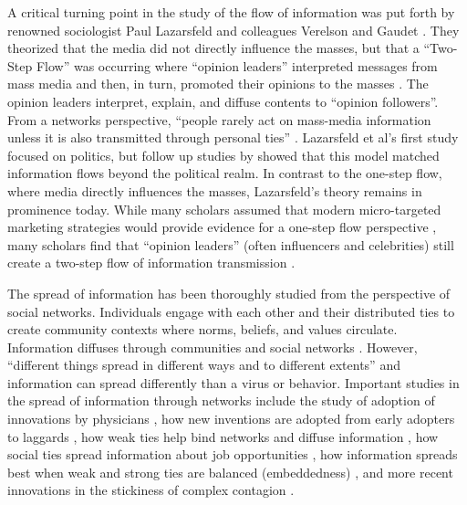 A critical turning point in the study of the flow of information was put forth
by renowned sociologist Paul Lazarsfeld and colleagues Verelson and Gaudet
\citeyearpar{lazarsfeldPeopleChoice1944}. They theorized that the media did not
directly influence the masses, but that a ``Two-Step Flow'' was occurring where
``opinion leaders'' interpreted messages from mass media and then, in turn,
promoted their opinions to the masses \citep{katzPersonalInfluencePart1955}. The
opinion leaders interpret, explain, and diffuse contents to ``opinion followers''.
From a networks perspective, ``people rarely act on mass-media information unless
it is also transmitted through personal ties'' \citep[p.
1374]{granovetterStrengthWeakTies1973}. Lazarsfeld et al's
\citeyearpar{lazarsfeldPeopleChoice1944} first study focused on politics, but
follow up studies by \citet{katzPersonalInfluencePart1955} showed that this
model matched information flows beyond the political realm. In contrast to the
one-step flow, where media directly influences the masses, Lazarsfeld's theory
remains in prominence today. While many scholars assumed that modern
micro-targeted marketing strategies would provide evidence for a one-step flow
perspective \citep{bennettOneStepFlowCommunication2006}, many scholars find that
``opinion leaders'' (often influencers and celebrities) still create a two-step
flow of information transmission \citep{choi15, hilbertOneStepTwo2017}.

The spread of information has been thoroughly studied from the perspective of
social networks. Individuals engage with each other and their distributed ties
to create community contexts where norms, beliefs, and values circulate.
Information diffuses through communities and social networks
\citep{fowler2010cooperative, bond_etal12, klarEffectNetworkStructure2017}.
However, ``different things spread in different ways and to different extents''
\citep[p. 563]{christakisSocialContagionTheory2013} and information can spread
differently than a virus or behavior. Important studies in the spread of
information through networks include the study of adoption of innovations by
physicians \citep{colemanDiffusionInnovationPhysicians1957}, how new inventions
are adopted from early adopters to laggards
\citep{rogersDiffusionInnovations1962}, how weak ties help bind networks and
diffuse information \citep{granovetterStrengthWeakTies1973}, how social ties
spread information about job opportunities
\citep{granovetterGettingJobStudy1995, montgomeryJobSearchNetwork1992}, how
information spreads best when weak and strong ties are balanced (embeddedness)
\citep{uzziSocialStructureCompetition1997}, and more recent innovations in the
stickiness of complex contagion \citep{centolaComplexContagionsWeakness2007}.

